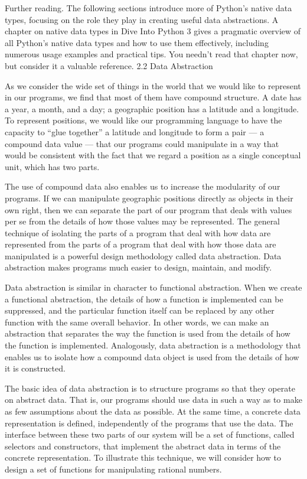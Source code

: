 \documentclass[letterpaper,10pt,dvipdfmx]{sphinxmanual}
\begin{document}
Further reading. The following sections introduce more of Python's native data types, focusing on the role they play in creating useful data abstractions. A chapter on native data types in Dive Into Python 3 gives a pragmatic overview of all Python's native data types and how to use them effectively, including numerous usage examples and practical tips. You needn't read that chapter now, but consider it a valuable reference.
2.2   Data Abstraction

As we consider the wide set of things in the world that we would like to represent in our programs, we find that most of them have compound structure. A date has a year, a month, and a day; a geographic position has a latitude and a longitude. To represent positions, we would like our programming language to have the capacity to ``glue together'' a latitude and longitude to form a pair --- a compound data value --- that our programs could manipulate in a way that would be consistent with the fact that we regard a position as a single conceptual unit, which has two parts.

The use of compound data also enables us to increase the modularity of our programs. If we can manipulate geographic positions directly as objects in their own right, then we can separate the part of our program that deals with values per se from the details of how those values may be represented. The general technique of isolating the parts of a program that deal with how data are represented from the parts of a program that deal with how those data are manipulated is a powerful design methodology called data abstraction. Data abstraction makes programs much easier to design, maintain, and modify.

Data abstraction is similar in character to functional abstraction. When we create a functional abstraction, the details of how a function is implemented can be suppressed, and the particular function itself can be replaced by any other function with the same overall behavior. In other words, we can make an abstraction that separates the way the function is used from the details of how the function is implemented. Analogously, data abstraction is a methodology that enables us to isolate how a compound data object is used from the details of how it is constructed.

The basic idea of data abstraction is to structure programs so that they operate on abstract data. That is, our programs should use data in such a way as to make as few assumptions about the data as possible. At the same time, a concrete data representation is defined, independently of the programs that use the data. The interface between these two parts of our system will be a set of functions, called selectors and constructors, that implement the abstract data in terms of the concrete representation. To illustrate this technique, we will consider how to design a set of functions for manipulating rational numbers.
\end{document}
